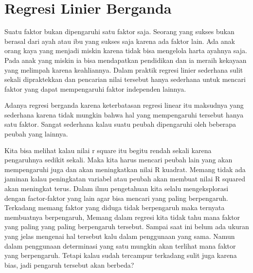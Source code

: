 \documentclass[
]{book}
\theoremstyle{definition}
\theoremstyle{definition}
\theoremstyle{definition}
\theoremstyle{definition}
\theoremstyle{remark}
\begin{document}
\hypertarget{regresi-linier-berganda}{%
\chapter{Regresi Linier Berganda}\label{regresi-linier-berganda}}

Suatu faktor bukan dipengaruhi satu faktor saja. Seorang yang sukses bukan berasal dari ayah atau ibu yang sukses saja karena ada faktor lain. Ada anak orang kaya yang menjadi miskin karena tidak bisa mengelola harta ayahnya saja. Pada anak yang miskin ia bisa mendapatkan pendidikan dan ia meraih kekayaan yang melimpah karena keahliannya. Dalam praktik regresi linier sederhana sulit sekali dipraktekkan dan pencarian nilai tersebut hanya sederhana untuk mencari faktor yang dapat mempengaruhi faktor independen lainnya.

Adanya regresi berganda karena keterbatasan regresi linear itu maksudnya yang sederhana karena tidak mungkin bahwa hal yang mempengaruhi tersebut hanya satu faktor. Sangat sederhana kalau suatu peubah dipengaruhi oleh beberapa peubah yang lainnya.

Kita bisa melihat kalau nilai r square itu begitu rendah sekali karena pengaruhnya sedikit sekali. Maka kita harus mencari peubah lain yang akan mempengaruhi juga dan akan meningkatkan nilai R kuadrat. Memang tidak ada jaminan kalau peningkatan variabel atau peubah akan membuat nilai R squared akan meningkat terus. Dalam ilmu pengetahuan kita selalu mengeksplorasi dengan factor-faktor yang lain agar bisa mencari yang paling berpengaruh. Terkadang memang faktor yang diduga tidak berpengaruh maka ternyata membuatnya berpengaruh, Memang dalam regresi kita tidak tahu mana faktor yang paling yang paling berpengaruh tersebut.
Sampai saat ini belum ada ukuran yang jelas mengenai hal tersebut kalu dalam penggunaan yang sama. Namun dalam penggunaan determinasi yang satu mungkin akan terlihat mana faktor yang berpengaruh. Tetapi kalau sudah tercampur terkadang sulit juga karena bias, jadi pengaruh tersebut akan berbeda?
\end{document}
